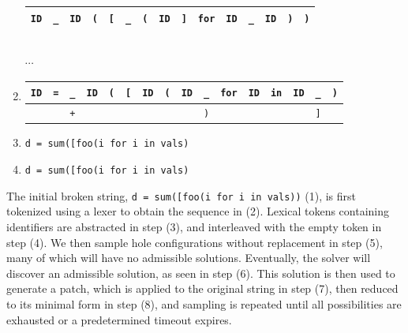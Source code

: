 \documentclass[sigplan,review,anonymous,acmsmall]{acmart}\settopmatter{printfolios=false,printccs=false,printacmref=false}
\begin{document}
\begin{enumerate}
\begin{tabular}{|||c|||c|||c|||c|||c|||c|||c|||c|||c|||c|||c|||c|||c|||c|||c|||}
          \hline
          \texttt{ID} & \cellcolor{black!15}\texttt{\_} & \texttt{ID} & \texttt{(} & \texttt{[} & \cellcolor{black!15}\texttt{\_} & \texttt{(} & \texttt{ID} & \texttt{]} & \texttt{for} & \texttt{ID} & \cellcolor{black!15}\texttt{\_} & \texttt{ID} & \texttt{)} & \texttt{)} \\\hline
  \end{tabular}\\$\cdots$
  \item \begin{tabular}{|||c|||c||c|c|||c|||c|||c|||c|||c|||c|||c|||c|||c|||c|||c|||c|||}
          \hline
          \texttt{ID} & \texttt{=} & \cellcolor{black!15}\texttt{\_} & \texttt{ID} & \texttt{(} & \texttt{[} & \texttt{ID} & \texttt{(} & \texttt{ID} & \cellcolor{black!15}\texttt{\_} & \texttt{for} & \texttt{ID} & \texttt{in} & \texttt{ID} & \cellcolor{black!15}\texttt{\_} & \texttt{)} \\\hline
          & & \cellcolor{green!25}\texttt{+} & & & & & & & \cellcolor{orange!25}\texttt{)} & & & & & \cellcolor{orange!25}\texttt{]} & \\\hline
  \end{tabular}
  \item \texttt{d = \hlgreen{+}sum([foo(i\hlorange{)} for i in vals\hlorange{]})}
  \item \texttt{d = sum([foo(i\hlorange{)} for i in vals\hlorange{]})}
\end{enumerate}

The initial broken string, \texttt{d = sum([foo(i\err{]} for i in vals))} (1), is first tokenized using a lexer to obtain the sequence in (2). Lexical tokens containing identifiers are abstracted in step (3), and interleaved with the empty token in step (4). We then sample hole configurations without replacement in step (5), many of which will have no admissible solutions. Eventually, the solver will discover an admissible solution, as seen in step (6). This solution is then used to generate a patch, which is applied to the original string in step (7), then reduced to its minimal form in step (8), and sampling is repeated until all possibilities are exhausted or a predetermined timeout expires.
\end{document}
